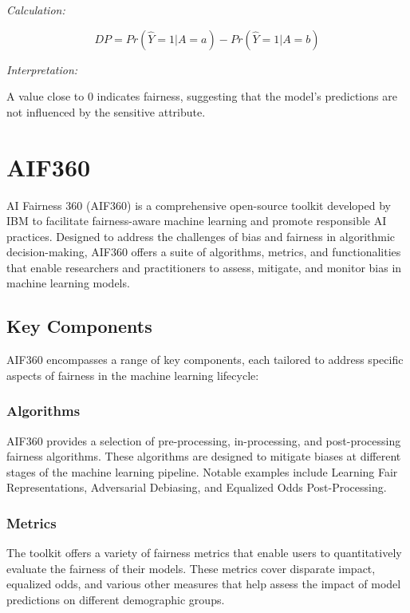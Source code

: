 \documentclass[12pt,a4paper,openright,twoside]{book}
\begin{document}
\emph{Calculation:}

\[ DP = Pr(\hat{Y} = 1|A = a) - Pr(\hat{Y} = 1|A = b) \]

\emph{Interpretation:}

A value close to 0 indicates fairness, suggesting that the model's predictions are not influenced by the sensitive attribute.

\newpage
\section{AIF360}
\label{section:aif350}

AI Fairness 360 (AIF360) is a comprehensive open-source toolkit developed by IBM to facilitate fairness-aware machine learning and promote responsible AI practices. Designed to address the challenges of bias and fairness in algorithmic decision-making, AIF360 offers a suite of algorithms, metrics, and functionalities that enable researchers and practitioners to assess, mitigate, and monitor bias in machine learning models.

\subsection{Key Components}

AIF360 encompasses a range of key components, each tailored to address specific aspects of fairness in the machine learning lifecycle:

\subsubsection{Algorithms}

AIF360 provides a selection of pre-processing, in-processing, and post-processing fairness algorithms. These algorithms are designed to mitigate biases at different stages of the machine learning pipeline. Notable examples include Learning Fair Representations, Adversarial Debiasing, and Equalized Odds Post-Processing.

\subsubsection{Metrics}

The toolkit offers a variety of fairness metrics that enable users to quantitatively evaluate the fairness of their models. These metrics cover disparate impact, equalized odds, and various other measures that help assess the impact of model predictions on different demographic groups.
\end{document}
